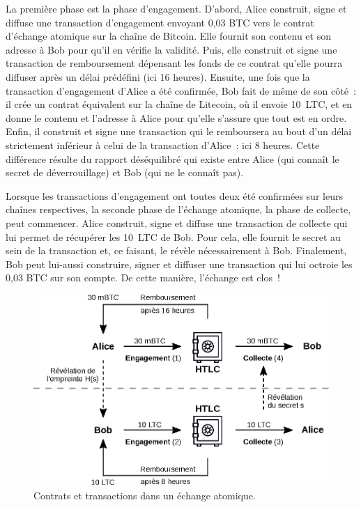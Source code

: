 La première phase est la phase d'engagement. D'abord, Alice construit, signe et diffuse une transaction d'engagement envoyant 0,03 BTC vers le contrat d'échange atomique sur la chaîne de Bitcoin. Elle fournit son contenu et son adresse à Bob pour qu'il en vérifie la validité. Puis, elle construit et signe une transaction de remboursement dépensant les fonds de ce contrat qu'elle pourra diffuser après un délai prédéfini (ici 16 heures). Ensuite, une fois que la transaction d'engagement d'Alice a été confirmée, Bob fait de même de son côté~: il crée un contrat équivalent sur la chaîne de Litecoin, où il envoie 10~LTC, et en donne le contenu et l'adresse à Alice pour qu'elle s'assure que tout est en ordre. Enfin, il construit et signe une transaction qui le remboursera au bout d'un délai strictement inférieur à celui de la transaction d'Alice~: ici 8 heures. Cette différence résulte du rapport déséquilibré qui existe entre Alice (qui connaît le secret de déverrouillage) et Bob (qui ne le connaît pas).

Lorsque les transactions d'engagement ont toutes deux été confirmées sur leurs chaînes respectives, la seconde phase de l'échange atomique, la phase de collecte, peut commencer. Alice construit, signe et diffuse une transaction de collecte qui lui permet de récupérer les 10~LTC de Bob. Pour cela, elle fournit le secret au sein de la transaction et, ce faisant, le révèle nécessairement à Bob. Finalement, Bob peut lui-aussi construire, signer et diffuser une transaction qui lui octroie les 0,03 BTC sur son compte. De cette manière, l'échange est clos~!

\begin{figure}[ht]
  \centering
  \includegraphics[scale=0.9]{img/atomic-swap-contract.eps}
  \caption{Contrats et transactions dans un échange atomique.}
  \label{fig:atomic-swap-contract}
\end{figure}

